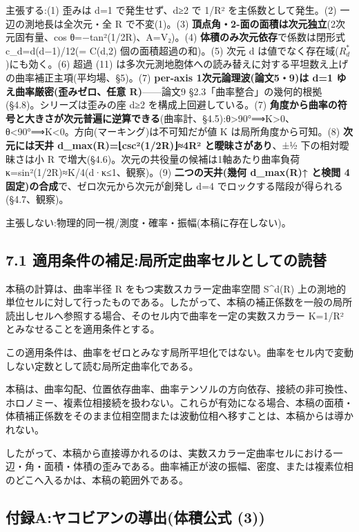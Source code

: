 \documentclass[
]{ltjsarticle}
\begin{document}
主張する:(1) 歪みは d=1 で発生せず、d≥2 で 1/R² を主係数として発生。(2)
一辺の測地長は全次元・全 R で不変(1)。(3)
\textbf{頂点角・2-面の面積は次元独立}(2次元固有量、cos
θ=−tan²(1/2R)、A=V₂)。(4) \textbf{体積のみ次元依存}で係数は閉形式
c\_d=d(d−1)/12(= C(d,2) 個の面積超過の和)。(5) 次元 d
は値でなく存在域(\(R^{*}_{d}\))にも効く。(6) 超過 (11)
は多次元測地胞体への読み替えに対する平坦数え上げの曲率補正主項(平均場、§5)。(7)
\textbf{per-axis 1次元論理波(論文5・9)は d=1 ゆえ曲率厳密(歪みゼロ、任意
R)}------論文9 §2.3「曲率整合」の幾何的根拠(§4.8)。シリーズは歪みの座
d≥2 を構成上回避している。(7)
\textbf{角度から曲率の符号と大きさが次元普遍に逆算できる}(曲率計、§4.5):θ\textgreater90°⟹K\textgreater0、θ\textless90°⟹K\textless0。方向(マーキング)は不可知だが値
K は局所角度から可知。(8) \textbf{次元には天井
d\_max(R)=⌊csc²(1/2R)⌋≈4R² と曖昧さがあり}、±½ 下の相対曖昧さは小 R
で増大(§4.6)。次元の共役量の候補は1軸あたり曲率負荷
κ=sin²(1/2R)≈K/4(d·κ≤1、観察)。(9) \textbf{二つの天井(幾何 d\_max(R)↑
と検閲 4 固定)の合成}で、ゼロ次元から次元が創発し d=4
でロックする階段が得られる(§4.7、観察)。

主張しない:物理的同一視/測度・確率・振幅(本稿に存在しない)。

\subsection{7.1
適用条件の補足:局所定曲率セルとしての読替}\label{ux9069ux7528ux6761ux4ef6ux306eux88dcux8db3ux5c40ux6240ux5b9aux66f2ux7387ux30bbux30ebux3068ux3057ux3066ux306eux8aadux66ff}

本稿の計算は、曲率半径 R をもつ実数スカラー定曲率空間 S\^{}d(R)
上の測地的単位セルに対して行ったものである。したがって、本稿の補正係数を一般の局所読出しセルへ参照する場合、そのセル内で曲率を一定の実数スカラー
K=1/R² とみなせることを適用条件とする。

この適用条件は、曲率をゼロとみなす局所平坦化ではない。曲率をセル内で変動しない定数として読む局所定曲率化である。

本稿は、曲率勾配、位置依存曲率、曲率テンソルの方向依存、接続の非可換性、ホロノミー、複素位相接続を扱わない。これらが有効になる場合、本稿の面積・体積補正係数をそのまま位相空間または波動位相へ移すことは、本稿からは導かれない。

したがって、本稿から直接導かれるのは、実数スカラー定曲率セルにおける一辺・角・面積・体積の歪みである。曲率補正が波の振幅、密度、または複素位相のどこへ入るかは、本稿の範囲外である。

\subsection{付録A:ヤコビアンの導出(体積公式
(3))}\label{ux4ed8ux9332aux30e4ux30b3ux30d3ux30a2ux30f3ux306eux5c0eux51faux4f53ux7a4dux516cux5f0f-3}
\end{document}
